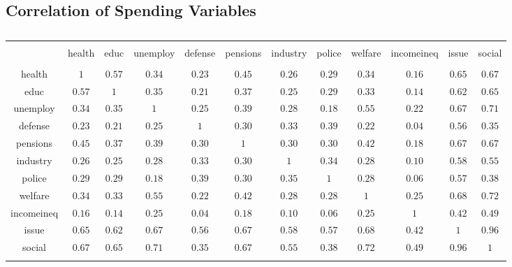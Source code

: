 \documentclass[12pt, titlepage]{article}
\begin{document}
\begin{landscape}
\section{Correlation of Spending Variables}

\begin{table}[H] \centering 
	\caption{} 
	\label{} 
	\begin{tabular}{ cccccccccccc} 
		\\[-1.8ex]\hline 
		\hline \\[-1.8ex] 
		& health & educ & unemploy & defense & pensions & industry & police & welfare & incomeineq & issue & social \\ 
		\hline \\[-1.8ex] 
		health & $1$ & $0.57$ & $0.34$ & $0.23$ & $0.45$ & $0.26$ & $0.29$ & $0.34$ & $0.16$ & $0.65$ & $0.67$ \\ 
		educ & $0.57$ & $1$ & $0.35$ & $0.21$ & $0.37$ & $0.25$ & $0.29$ & $0.33$ & $0.14$ & $0.62$ & $0.65$ \\ 
		unemploy & $0.34$ & $0.35$ & $1$ & $0.25$ & $0.39$ & $0.28$ & $0.18$ & $0.55$ & $0.22$ & $0.67$ & $0.71$ \\ 
		defense & $0.23$ & $0.21$ & $0.25$ & $1$ & $0.30$ & $0.33$ & $0.39$ & $0.22$ & $0.04$ & $0.56$ & $0.35$ \\ 
		pensions & $0.45$ & $0.37$ & $0.39$ & $0.30$ & $1$ & $0.30$ & $0.30$ & $0.42$ & $0.18$ & $0.67$ & $0.67$ \\ 
		industry & $0.26$ & $0.25$ & $0.28$ & $0.33$ & $0.30$ & $1$ & $0.34$ & $0.28$ & $0.10$ & $0.58$ & $0.55$ \\ 
		police & $0.29$ & $0.29$ & $0.18$ & $0.39$ & $0.30$ & $0.35$ & $1$ & $0.28$ & $0.06$ & $0.57$ & $0.38$ \\ 
		welfare & $0.34$ & $0.33$ & $0.55$ & $0.22$ & $0.42$ & $0.28$ & $0.28$ & $1$ & $0.25$ & $0.68$ & $0.72$ \\ 
		incomeineq & $0.16$ & $0.14$ & $0.25$ & $0.04$ & $0.18$ & $0.10$ & $0.06$ & $0.25$ & $1$ & $0.42$ & $0.49$ \\ 
		issue & $0.65$ & $0.62$ & $0.67$ & $0.56$ & $0.67$ & $0.58$ & $0.57$ & $0.68$ & $0.42$ & $1$ & $0.96$ \\ 
		social & $0.67$ & $0.65$ & $0.71$ & $0.35$ & $0.67$ & $0.55$ & $0.38$ & $0.72$ & $0.49$ & $0.96$ & $1$ \\ 
		\hline \\[-1.8ex] 
	\end{tabular} 
\end{table} 

\end{landscape}
\end{document}
